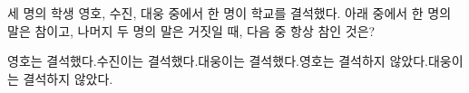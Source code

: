 세 명의 학생 영호, 수진, 대웅 중에서 한 명이 학교를 결석했다. 아래 중에서 한 명의 말은 참이고, 나머지 두 명의 말은 거짓일 때, 다음 중 항상 참인 것은? 
\begin{choicesv}{영호는 결석했다.}{수진이는 결석했다.}{대웅이는 결석했다.}{영호는 결석하지 않았다.}{대웅이는 결석하지 않았다.}\end{choicesv}
